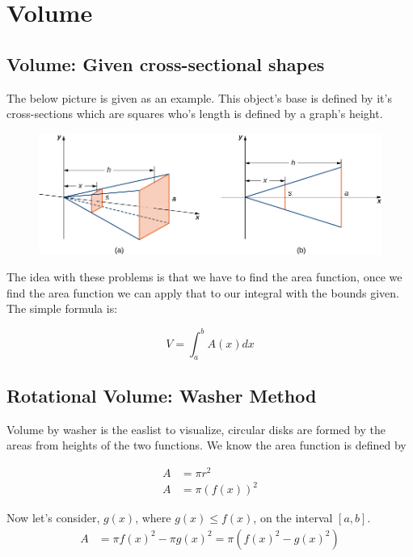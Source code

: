 \section{Volume}

\subsection{Volume: Given cross-sectional shapes}
The below picture is given as an example. This object's base is defined by it's cross-sections which are squares who's length is defined by a graph's height.

\begin{figure}[H]
	\begin{center}
		\includegraphics[scale=0.50]{pages/images/crossbase}
		\label{fig:fig4}
	\end{center}
\end{figure}

The idea with these problems is that we have to find the area function, once we find the area function we can apply that to our integral with the bounds given. The simple formula is:

\begin{equation}
	V = \int_a^b{A(x)} dx
\end{equation}

\pagebreak
\subsection{Rotational Volume: Washer Method}
Volume by washer is the easlist to visualize, circular disks are formed by the areas from heights of the two functions. We know the area function is defined by 

\begin{align*}
	A &= \pi r^2 \\ 
	A &= \pi (f(x))^2
\end{align*}

Now let's consider, $g(x)$, where $g(x) \leq f(x)$, on the interval $[a,b]$. 
\begin{align*}
	A &= \pi f(x)^2 - \pi g(x)^2 = \pi(f(x)^2 - g(x)^2)
\end{align*}

